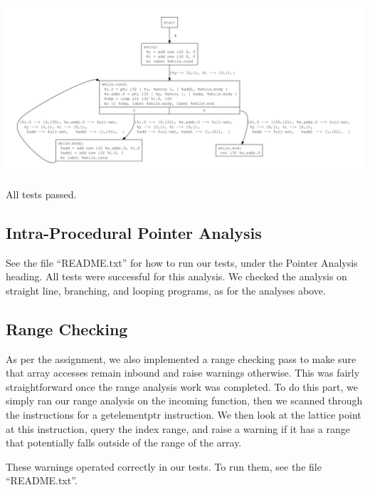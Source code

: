 \documentclass{article}
\theoremstyle{definition}
\begin{document}
\begin{center}
  \includegraphics[scale=.4]{figures/ra/loop/loop.pdf}
\end{center}

All tests passed.
\subsection{Intra-Procedural Pointer Analysis}
See the file ``README.txt'' for how to run our tests, under the
Pointer Analysis heading. All tests were successful for this
analysis. We checked the analysis on straight line, branching, and
looping programs, as for the analyses above.
\subsection{Range Checking}

As per the assignment, we also implemented a range checking pass to
make sure that array accesses remain inbound and raise warnings
otherwise. This was fairly straightforward once the range analysis
work was completed. To do this part, we simply ran our range analysis
on the incoming function, then we scanned through the instructions for
a getelementptr instruction. We then look at the lattice point at this
instruction, query the index range, and raise a warning if it has a
range that potentially falls outside of the range of the array.

These warnings operated correctly in our tests. To run them, see the
file ``README.txt''.
\end{document}
